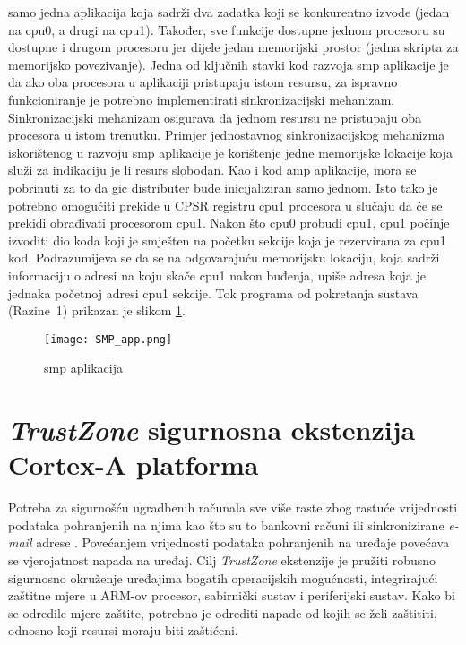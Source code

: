 \documentclass[times, utf8, diplomski, numeric]{fer}
\begin{document}
samo jedna aplikacija koja sadrži dva zadatka koji se konkurentno izvode (jedan na \gls{cpu}0, a drugi na \gls{cpu}1). Također, sve
funkcije dostupne jednom procesoru su dostupne i drugom procesoru jer dijele jedan memorijski prostor (jedna skripta za
memorijsko povezivanje). Jedna od ključnih stavki kod razvoja \gls{smp} aplikacije je da ako oba procesora u aplikaciji pristupaju
istom resursu, za ispravno funkcioniranje je potrebno implementirati sinkronizacijski mehanizam. Sinkronizacijski mehanizam
osigurava da jednom resursu ne pristupaju oba procesora u istom trenutku. Primjer jednostavnog sinkronizacijskog mehanizma
iskorištenog u razvoju \gls{smp} aplikacije je korištenje jedne memorijske lokacije koja služi za indikaciju je li resurs slobodan.
Kao i kod \gls{amp} aplikacije, mora se pobrinuti za to da \gls{gic} distributer bude inicijaliziran samo jednom. Isto tako je potrebno
omogućiti prekide u CPSR registru \gls{cpu}1 procesora u slučaju da će se prekidi obrađivati procesorom \gls{cpu}1. Nakon što \gls{cpu}0
probudi \gls{cpu}1, \gls{cpu}1 počinje izvoditi dio koda koji je smješten na početku sekcije koja je rezervirana za \gls{cpu}1 kod.
Podrazumijeva se da se na odgovarajuću memorijsku lokaciju, koja sadrži informaciju o adresi na koju skače \gls{cpu}1 nakon buđenja,
upiše adresa koja je jednaka početnoj adresi \gls{cpu}1 sekcije. Tok programa od pokretanja sustava (Razine~1) prikazan je slikom
\ref{smp_app}.
\begin{figure}[H]
  \centering
	\texttt{[image: SMP\_app.png]}%
	\caption{\gls{smp} aplikacija}
	\label{smp_app}%
\end{figure}

\chapter{\textit{TrustZone} sigurnosna ekstenzija Cortex-A platforma}
Potreba za sigurnošću ugradbenih računala sve više raste zbog rastuće vrijednosti podataka pohranjenih na njima kao
što su to bankovni računi ili sinkronizirane \textit{e-mail} adrese \cite{tz_wp}. Povećanjem vrijednosti podataka pohranjenih na
uređaje povećava se vjerojatnost napada na uređaj. Cilj \textit{TrustZone} ekstenzije je pružiti robusno sigurnosno okruženje
uređajima bogatih operacijskih mogućnosti, integrirajući zaštitne mjere u ARM-ov procesor, sabirnički sustav i periferijski
sustav. Kako bi se odredile mjere zaštite, potrebno je odrediti napade od kojih se želi zaštititi, odnosno koji resursi
moraju biti zaštićeni.
\end{document}

